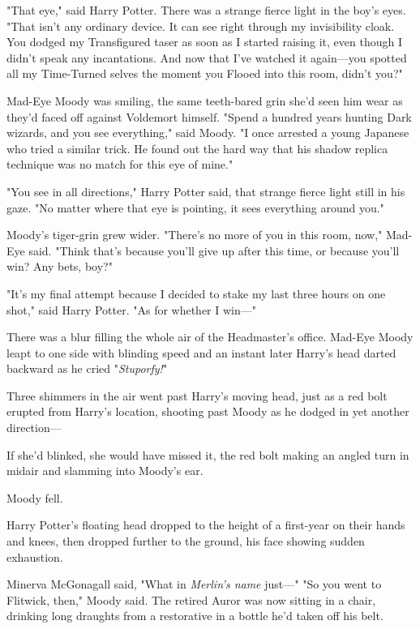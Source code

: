 "That eye," said Harry Potter. There was a strange fierce light in the boy's
eyes. "That isn't any ordinary device. It can see right through my invisibility
cloak. You dodged my Transfigured taser as soon as I started raising it, even
though I didn't speak any incantations. And now that I've watched it
again---you spotted all my Time-Turned selves the moment you Flooed into this
room, didn't you?"

Mad-Eye Moody was smiling, the same teeth-bared grin she'd seen him wear as
they'd faced off against Voldemort himself. "Spend a hundred years hunting Dark
wizards, and you see everything," said Moody. "I once arrested a young Japanese
who tried a similar trick. He found out the hard way that his shadow replica
technique was no match for this eye of mine."

"You see in all directions," Harry Potter said, that strange fierce light still
in his gaze. "No matter where that eye is pointing, it sees everything around
you."

Moody's tiger-grin grew wider. "There's no more of you in this room, now,"
Mad-Eye said. "Think that's because you'll give up after this time, or because
you'll win? Any bets, boy?"

"It's my final attempt because I decided to stake my last three hours on one
shot," said Harry Potter. "As for whether I win---"

There was a blur filling the whole air of the Headmaster's office. Mad-Eye
Moody leapt to one side with blinding speed and an instant later Harry's head
darted backward as he cried "\emph{Stuporfy!}"

Three shimmers in the air went past Harry's moving head, just as a red bolt
erupted from Harry's location, shooting past Moody as he dodged in yet another
direction---

If she'd blinked, she would have missed it, the red bolt making an angled turn
in midair and slamming into Moody's ear.

Moody fell.

Harry Potter's floating head dropped to the height of a first-year on their
hands and knees, then dropped further to the ground, his face showing sudden
exhaustion.

Minerva McGonagall said, "What in \emph{Merlin's name} just---"
\sbreak
"So you went to Flitwick, then," Moody said. The retired Auror was now sitting
in a chair, drinking long draughts from a restorative in a bottle he'd taken
off his belt.

